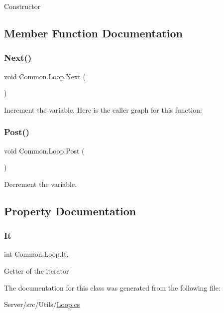 Constructor 

\subsection{Member Function Documentation}
\mbox{\label{class_common_1_1_loop_a89e95db2c31d2051e3eb49b5f456cb8a}} 
\subsubsection{\texorpdfstring{Next()}{Next()}}
{\footnotesize\ttfamily void Common.\+Loop.\+Next (\begin{DoxyParamCaption}{ }\end{DoxyParamCaption})\hspace{0.3cm}{\ttfamily [inline]}}

Increment the variable. Here is the caller graph for this function\+:
\mbox{\label{class_common_1_1_loop_a89f731e95864e90a858a613971e23e86}} 
\subsubsection{\texorpdfstring{Post()}{Post()}}
{\footnotesize\ttfamily void Common.\+Loop.\+Post (\begin{DoxyParamCaption}{ }\end{DoxyParamCaption})\hspace{0.3cm}{\ttfamily [inline]}}

Decrement the variable. 

\subsection{Property Documentation}
\mbox{\label{class_common_1_1_loop_a248a360b79b01a1f76a314498c7f462f}} 
\subsubsection{\texorpdfstring{It}{It}}
{\footnotesize\ttfamily int Common.\+Loop.\+It\hspace{0.3cm}{\ttfamily [get]}, {\ttfamily [set]}}

Getter of the iterator 

The documentation for this class was generated from the following file\+:\begin{DoxyCompactItemize}
\item 
Server/src/\+Utils/\hyperlink{_loop_8cs}{Loop.\+cs}\end{DoxyCompactItemize}
